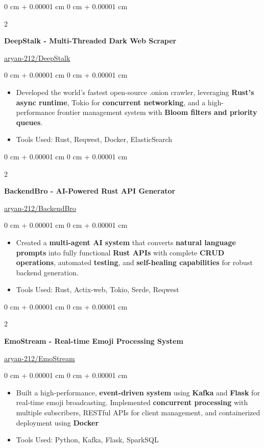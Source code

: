 \documentclass[10pt, letterpaper]{article}
\newenvironment{highlights}{
    \begin{itemize}[
        topsep=0.10 cm,
        parsep=0.10 cm,
        partopsep=0pt,
        itemsep=0pt,
        leftmargin=0 cm + 10pt
    ]
}{
    \end{itemize}
} %
\newenvironment{onecolentry}{
    \begin{adjustwidth}{
        0 cm + 0.00001 cm
    }{
        0 cm + 0.00001 cm
    }
}{
    \end{adjustwidth}
} %
\newenvironment{twocolentry}[2][]{
    \onecolentry
    \def\secondColumn{#2}
    \setcolumnwidth{\fill, 4.5 cm}
    \begin{paracol}{2}
}{
    \switchcolumn \raggedleft \secondColumn
    \end{paracol}
    \endonecolentry
} %
\begin{document}
\vspace{0.2 cm}
\begin{twocolentry}{
    \href{https://github.com/aryan-212/DeepStalk.git}{aryan-212/DeepStalk}
}
    \textbf{DeepStalk - Multi-Threaded Dark Web Scraper}
\end{twocolentry}

\begin{onecolentry}
    \begin{highlights}
            \item Developed the world's fastest open-source .onion crawler, leveraging \textbf{Rust's async runtime}, Tokio for \textbf{concurrent networking}, and a high-performance frontier management system with \textbf{Bloom filters and priority queues}.
        \item Tools Used: Rust, Reqwest, Docker, ElasticSearch
    \end{highlights}
\end{onecolentry}

\vspace{0.2 cm}
\begin{twocolentry}{
    \href{https://github.com/aryan-212/BackendBro.git}{aryan-212/BackendBro}
}
    \textbf{BackendBro - AI-Powered Rust API Generator}
\end{twocolentry}

\begin{onecolentry}
    \begin{highlights}
        \item Created a \textbf{multi-agent AI system} that converts \textbf{natural language prompts} into fully functional \textbf{Rust APIs} with complete \textbf{CRUD operations}, automated \textbf{testing}, and \textbf{self-healing capabilities} for robust backend generation.

        \item Tools Used: Rust, Actix-web, Tokio, Serde, Reqwest
    \end{highlights}
\end{onecolentry}

\vspace{0.2 cm}
\begin{twocolentry}{
    \href{https://github.com/aryan-212/EmoStream}{aryan-212/EmoStream}
}
    \textbf{EmoStream - Real-time Emoji Processing System}
\end{twocolentry}

\begin{onecolentry}
    \begin{highlights}
        \item Built a high-performance, \textbf{event-driven system} using \textbf{Kafka} and \textbf{Flask} for real-time emoji broadcasting. Implemented \textbf{concurrent processing} with multiple subscribers, RESTful APIs for client management, and containerized deployment using \textbf{Docker}
        \item Tools Used: Python, Kafka, Flask, SparkSQL
    \end{highlights}
\end{onecolentry}
\end{document}
